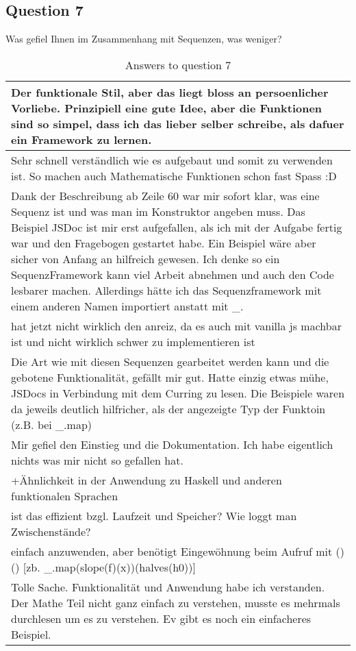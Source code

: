 \subsection*{Question 7}
\label{sub:ut_q7}
Was gefiel Ihnen im Zusammenhang mit Sequenzen, was weniger?
\begin{table}[H]
  \centering
  \begin{tabularx}{\textwidth}{| X |} \hline
   Der funktionale Stil, aber das liegt bloss an persoenlicher Vorliebe. Prinzipiell eine gute Idee, aber die Funktionen sind so simpel, dass ich das lieber selber schreibe, als dafuer ein Framework zu lernen. \\ \hline 
   Sehr schnell verständlich wie es aufgebaut und somit zu verwenden ist. So machen auch Mathematische Funktionen schon fast Spass :D \\ \hline 
   Dank der Beschreibung ab Zeile 60 war mir sofort klar, was eine Sequenz ist und was man im Konstruktor angeben muss. Das Beispiel JSDoc ist mir erst aufgefallen, als ich mit der Aufgabe fertig war und den Fragebogen gestartet habe. Ein Beispiel wäre aber sicher von Anfang an hilfreich gewesen. Ich denke so ein SequenzFramework kann viel Arbeit abnehmen und auch den Code lesbarer machen. Allerdings hätte ich das Sequenzframework mit einem anderen Namen importiert anstatt mit \_. \\ \hline
   hat jetzt nicht wirklich den anreiz, da es auch mit vanilla js machbar ist und nicht wirklich schwer zu implementieren ist \\ \hline 
   Die Art wie mit diesen Sequenzen gearbeitet werden kann und die gebotene Funktionalität, gefällt mir gut. Hatte einzig etwas mühe, JSDocs in Verbindung mit dem Curring zu lesen. Die Beispiele waren da jeweils deutlich hilfricher, als der angezeigte Typ der Funktoin (z.B. bei \_.map) \\ \hline 
   Mir gefiel den Einstieg und die Dokumentation. Ich habe eigentlich nichts was mir nicht so gefallen hat. \\ \hline 
   +Ähnlichkeit in der Anwendung zu Haskell und anderen funktionalen Sprachen \\ \hline 
   ist das effizient bzgl. Laufzeit und Speicher? Wie loggt man Zwischenstände? \\ \hline 
   einfach anzuwenden, aber benötigt Eingewöhnung beim Aufruf mit ()() [zb. \_.map(slope(f)(x))(halves(h0))] \\ \hline 
   Tolle Sache. Funktionalität und Anwendung habe ich verstanden. Der Mathe Teil nicht ganz einfach zu verstehen, musste es mehrmals durchlesen um es zu verstehen. Ev gibt es noch ein einfacheres Beispiel. \\ \hline 
  \end{tabularx}
  \caption{Answers to question 7}
  \label{tab:app_usertest_q7}
\end{table}

